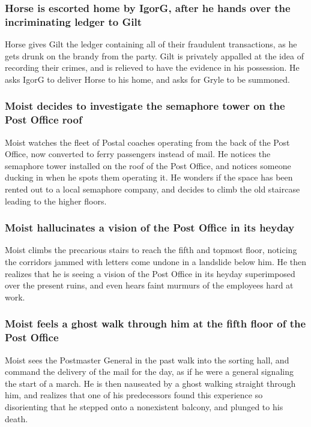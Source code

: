 \subsubsection{\Gls{Horse} is escorted home by \Gls{IgorG}, after he hands over the incriminating
    ledger to \Gls{Gilt}}
\Gls{Horse} gives \Gls{Gilt} the ledger containing all of their fraudulent transactions, as he gets
drunk on the brandy from the party. \Gls{Gilt} is privately appalled at the idea of recording their
crimes, and is relieved to have the evidence in his possession. He asks \Gls{IgorG} to deliver
\Gls{Horse} to his home, and asks for \Gls{Gryle} to be summoned.

\subsubsection{\Gls{Moist} decides to investigate the semaphore tower on the Post Office roof}
\Gls{Moist} watches the fleet of Postal coaches operating from the back of the Post Office, now
converted to ferry passengers instead of mail. He notices the semaphore tower installed on the
roof of the Post Office, and notices someone ducking in when he spots them operating it. He wonders
if the space has been rented out to a local semaphore company, and decides to climb the old
staircase leading to the higher floors.

\subsubsection{\Gls{Moist} hallucinates a vision of the Post Office in its heyday}
\Gls{Moist} climbs the precarious stairs to reach the fifth and topmost floor, noticing the
corridors jammed with letters come undone in a landslide below him. He then realizes that he is
seeing a vision of the Post Office in its heyday superimposed over the present ruins, and even
hears faint murmurs of the employees hard at work.

\subsubsection{\Gls{Moist} feels a ghost walk through him at the fifth floor of the Post Office}
\Gls{Moist} sees the Postmaster General in the past walk into the sorting hall, and command the
delivery of the mail for the day, as if he were a general signaling the start of a march. He is
then nauseated by a ghost walking straight through him, and realizes that one of his predecessors
found this experience so disorienting that he stepped onto a nonexistent balcony, and plunged to
his death.

